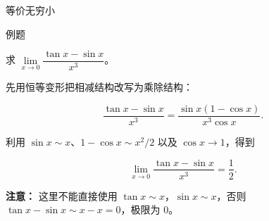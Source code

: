 \documentclass[aspectratio=169,10pt,fontset=fandol]{ctexbeamer}
\newenvironment{custom}[1]{\par\noindent\textbf{#1}\quad}{\par\vspace{0.8em}}
\begin{document}
\begin{frame}[t,fragile]{等价无穷小}
\normalsize
\begin{block}{例题}
{\normalsize


求 \(\lim\limits_{x \to 0} \dfrac{\tan x - \sin x}{x^3}\)。









\begin{solution}

	先用恒等变形把相减结构改写为乘除结构：

	\[

	\frac{\tan x-\sin x}{x^3}

	=\frac{\sin x(1-\cos x)}{x^3\cos x}.

	\]

	利用 \(\sin x\sim x\)、\(1-\cos x\sim x^2/2\) 以及 \(\cos x\to1\)，得到

	\[

	\lim_{x\to0}\frac{\tan x-\sin x}{x^3}

	=\frac12.

	\]

	

\end{solution}



\textbf{注意：} 这里不能直接使用 \(\tan x \sim x\)，\(\sin x \sim x\)，否则 \(\tan x - \sin x \sim x - x = 0\)，极限为 0。

}
\end{block}
\end{frame}
\end{document}
